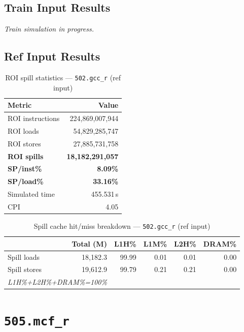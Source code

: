 \documentclass[11pt,a4paper]{article}
\begin{document}
\subsection{Train Input Results}

\textit{Train simulation in progress.}


\subsection{Ref Input Results}

\begin{table}[H]
\centering
\caption{ROI spill statistics --- \texttt{502.gcc\_r} (ref input)}
\label{tab:gcc_ref_roi}
\begin{tabular}{lr}
\toprule
\textbf{Metric} & \textbf{Value} \\
\midrule
ROI instructions & 224,869,007,944 \\
ROI loads        & 54,829,285,747 \\
ROI stores       & 27,885,731,758 \\
\textbf{ROI spills}   & \textbf{18,182,291,057} \\
\textbf{SP/inst\%}   & \textbf{8.09\%} \\
\textbf{SP/load\%}   & \textbf{33.16\%} \\
Simulated time   & 455.531\,s \\
CPI              & 4.05 \\
\bottomrule
\end{tabular}
\end{table}

\begin{table}[H]
\centering
\caption{Spill cache hit/miss breakdown --- \texttt{502.gcc\_r} (ref input)}
\label{tab:gcc_ref_cache}
\begin{tabular}{lrrrrr}
\toprule
\textbf{} & \textbf{Total (M)} & \textbf{L1H\%} & \textbf{L1M\%} & \textbf{L2H\%} & \textbf{DRAM\%} \\
\midrule
Spill loads  & 18,182.3 & 99.99 & 0.01 & 0.01 & 0.00 \\
Spill stores & 19,612.9 & 99.79 & 0.21 & 0.21 & 0.00 \\
\multicolumn{2}{l}{\small\textit{L1H\%+L2H\%+DRAM\%=100\%}} \\
\bottomrule
\end{tabular}
\end{table}


\section{\texttt{505.mcf\_r}}
\label{sec:mcf}
\end{document}
